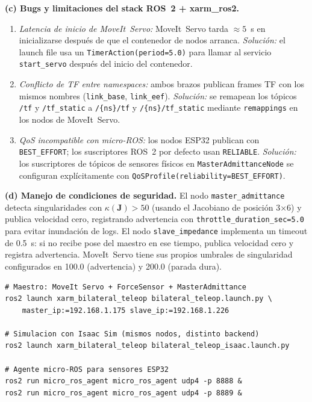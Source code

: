 \documentclass[journal,10pt,twoside]{IEEEtran}
\begin{document}
\textbf{(c) Bugs y limitaciones del stack ROS~2 + xarm\_ros2.}
\begin{enumerate}[label=\roman*.]
  \item \textit{Latencia de inicio de MoveIt~Servo:} MoveIt~Servo
        tarda $\approx 5$~s en inicializarse después de que el
        contenedor de nodos arranca. \textit{Solución:} el launch
        file usa un \texttt{TimerAction(period=5.0)} para llamar
        al servicio \texttt{start\_servo} después del inicio del
        contenedor.
  \item \textit{Conflicto de TF entre namespaces:} ambos brazos
        publican frames TF con los mismos nombres (\texttt{link\_base},
        \texttt{link\_eef}). \textit{Solución:} se remapean los tópicos
        \texttt{/tf} y \texttt{/tf\_static} a
        \texttt{/\{ns\}/tf} y \texttt{/\{ns\}/tf\_static}
        mediante \texttt{remappings} en los nodos de MoveIt~Servo.
  \item \textit{QoS incompatible con micro-ROS:} los nodos ESP32
        publican con \texttt{BEST\_EFFORT}; los suscriptores ROS~2
        por defecto usan \texttt{RELIABLE}. \textit{Solución:}
        los suscriptores de tópicos de sensores físicos en
        \texttt{MasterAdmittanceNode} se configuran explícitamente
        con \texttt{QoSProfile(reliability=BEST\_EFFORT)}.
\end{enumerate}

\textbf{(d) Manejo de condiciones de seguridad.}
El nodo \texttt{master\_admittance} detecta singularidades con
$\kappa(\bm{J}) > 50$ (usando el Jacobiano de posición 3×6) y
publica velocidad cero, registrando advertencia con
\texttt{throttle\_duration\_sec=5.0} para evitar inundación de logs.
El nodo \texttt{slave\_impedance} implementa un timeout de 0.5~s:
si no recibe pose del maestro en ese tiempo, publica velocidad cero
y registra advertencia. MoveIt~Servo tiene sus propios umbrales de
singularidad configurados en 100.0 (advertencia) y 200.0 (parada dura).

\begin{lstlisting}[caption={Configuración de launch para el sistema bilateral (bilateral\_teleop.launch.py)},
                   label={lst:setup}]
# Maestro: MoveIt Servo + ForceSensor + MasterAdmittance
ros2 launch xarm_bilateral_teleop bilateral_teleop.launch.py \
    master_ip:=192.168.1.175 slave_ip:=192.168.1.226

# Simulacion con Isaac Sim (mismos nodos, distinto backend)
ros2 launch xarm_bilateral_teleop bilateral_teleop_isaac.launch.py

# Agente micro-ROS para sensores ESP32
ros2 run micro_ros_agent micro_ros_agent udp4 -p 8888 &
ros2 run micro_ros_agent micro_ros_agent udp4 -p 8889 &
\end{lstlisting}
\end{document}
